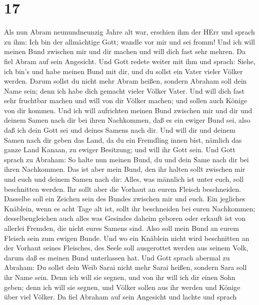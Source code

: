 \hypertarget{section-16}{%
\section{17}\label{section-16}}

 Als nun Abram neunundneunzig Jahre alt war, erschien ihm
der HErr und sprach zu ihm: Ich bin der allmächtige Gott; wandle vor mir
und sei fromm!  Und ich will meinen Bund zwischen mir und
dir machen und will dich fast sehr mehren.  Da fiel Abram
auf sein Angesicht. Und Gott redete weiter mit ihm und sprach:
 Siehe, ich bin's und habe meinen Bund mit dir, und du
sollst ein Vater vieler Völker werden.  Darum sollst du
nicht mehr Abram heißen, sondern Abraham soll dein Name sein; denn ich
habe dich gemacht vieler Völker Vater.  Und will dich fast
sehr fruchtbar machen und will von dir Völker machen; und sollen auch
Könige von dir kommen.  Und ich will aufrichten meinen Bund
zwischen mir und dir und deinem Samen nach dir bei ihren Nachkommen, daß
es ein ewiger Bund sei, also daß ich dein Gott sei und deines Samens
nach dir.  Und will dir und deinem Samen nach dir geben das
Land, da du ein Fremdling innen bist, nämlich das ganze Land Kanaan, zu
ewiger Besitzung; und will ihr Gott sein.  Und Gott sprach
zu Abraham: So halte nun meinen Bund, du und dein Same nach dir bei
ihren Nachkommen.  Das ist aber mein Bund, den ihr halten
sollt zwischen mir und euch und deinem Samen nach dir: Alles, was
männlich ist unter euch, soll beschnitten werden.  Ihr
sollt aber die Vorhaut an eurem Fleisch beschneiden. Dasselbe soll ein
Zeichen sein des Bundes zwischen mir und euch.  Ein
jegliches Knäblein, wenn es acht Tage alt ist, sollt ihr beschneiden bei
euren Nachkommen; desselbengleichen auch alles was Gesindes daheim
geboren oder erkauft ist von allerlei Fremden, die nicht eures Samens
sind.  Also soll mein Bund an eurem Fleisch sein zum ewigen
Bunde.  Und wo ein Knäblein nicht wird beschnitten an der
Vorhaut seines Fleisches, des Seele soll ausgerottet werden aus seinem
Volk, darum daß es meinen Bund unterlassen hat.  Und Gott
sprach abermal zu Abraham: Du sollst dein Weib Sarai nicht mehr Sarai
heißen, sondern Sara soll ihr Name sein.  Denn ich will sie
segnen, und von ihr will ich dir einen Sohn geben; denn ich will sie
segnen, und Völker sollen aus ihr werden und Könige über viel Völker.
 Da fiel Abraham auf sein Angesicht und lachte und sprach
